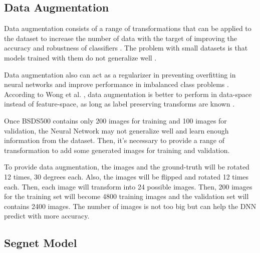 \documentclass[10pt,twocolumn,letterpaper]{article}
\begin{document}
\subsection{Data Augmentation} \label{ssec:data_augmentation}

Data augmentation consists of a range of transformations that can be applied to the dataset to increase the number of data with the target of improving the accuracy and robustness of classifiers \cite{AUGM_ADAPT}. The problem with small datasets is that models trained with them do not generalize well \cite{AUGM_DEEP}.

Data augmentation also can act as a regularizer in preventing overfitting in neural networks and improve performance in imbalanced class problems \cite{DATA_AUGM}. According to Wong et al. \cite{DATA_AUGM}, data augmentation is better to perform in data-space instead of feature-space, as long as label preserving transforms are known \cite{DATA_AUGM}.

Once BSDS500 contains only 200 images for training and 100 images for validation, the Neural Network may not generalize well and learn enough information from the dataset. Then, it's necessary to provide a range of transformation to add some generated images for training and validation.

To provide data augmentation, the images and the ground-truth will be rotated 12 times, 30 degrees each. Also, the images will be flipped and rotated 12 times each. Then, each image will transform into 24 possible images. Then, 200 images for the training set will become 4800 training images and the validation set will contains 2400 images. The number of images is not too big but can help the DNN predict with more accuracy.

\subsection{Segnet Model} \label{ssec:segnet_model}
\end{document}
